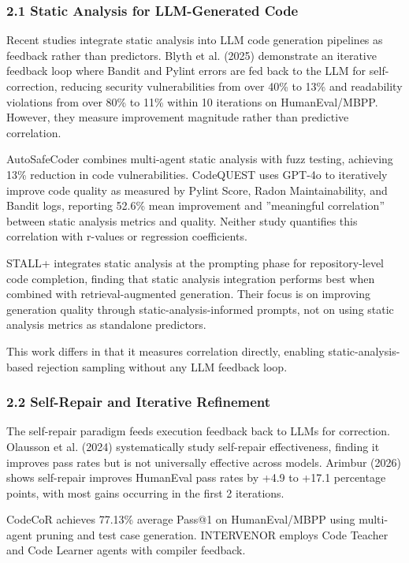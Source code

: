 
\subsubsection{2.1 Static Analysis for LLM-Generated Code}

Recent studies integrate static analysis into LLM code generation pipelines as feedback rather than predictors. Blyth et al. (2025) demonstrate an iterative feedback loop where Bandit and Pylint errors are fed back to the LLM for self-correction, reducing security vulnerabilities from over 40\% to 13\% and readability violations from over 80\% to 11\% within 10 iterations on HumanEval/MBPP. However, they measure improvement magnitude rather than predictive correlation.

AutoSafeCoder \citep{Nunez2024AutoSafeCoder} combines multi-agent static analysis with fuzz testing, achieving 13\% reduction in code vulnerabilities. CodeQUEST \citep{Liu2025CodeQUEST} uses GPT-4o to iteratively improve code quality as measured by Pylint Score, Radon Maintainability, and Bandit logs, reporting 52.6\% mean improvement and ''meaningful correlation'' between static analysis metrics and quality. Neither study quantifies this correlation with r-values or regression coefficients.

STALL+ \citep{Liu2024STALL} integrates static analysis at the prompting phase for repository-level code completion, finding that static analysis integration performs best when combined with retrieval-augmented generation. Their focus is on improving generation quality through static-analysis-informed prompts, not on using static analysis metrics as standalone predictors.

This work differs in that it measures correlation directly, enabling static-analysis-based rejection sampling without any LLM feedback loop.

\subsubsection{2.2 Self-Repair and Iterative Refinement}

The self-repair paradigm feeds execution feedback back to LLMs for correction. Olausson et al. (2024) systematically study self-repair effectiveness, finding it improves pass rates but is not universally effective across models. Arimbur (2026) shows self-repair improves HumanEval pass rates by +4.9 to +17.1 percentage points, with most gains occurring in the first 2 iterations.

CodeCoR \citep{Pan2025CodeCoR} achieves 77.13\% average Pass@1 on HumanEval/MBPP using multi-agent pruning and test case generation. INTERVENOR \citep{NEUIR2024} employs Code Teacher and Code Learner agents with compiler feedback.

